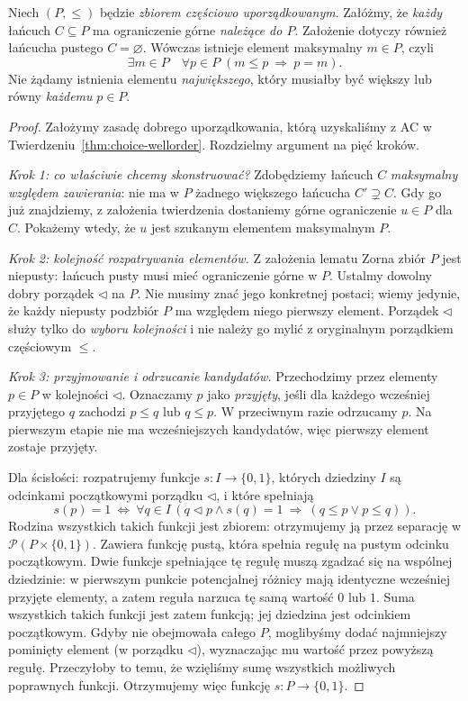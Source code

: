 \begin{twierdzenie}\label{thm:choice-zorn}
Niech $(P,\le)$ będzie \emph{zbiorem częściowo uporządkowanym}.
Załóżmy, że \emph{każdy} łańcuch $C\subseteq P$
ma ograniczenie górne \emph{należące do $P$}.
Założenie dotyczy również łańcucha pustego $C=\varnothing$.
Wówczas istnieje element maksymalny $m\in P$, czyli
\[
\exists m\in P\quad\forall p\in P\;(m\le p\ \Longrightarrow\ p=m).
\]
Nie żądamy istnienia elementu \emph{największego},
który musiałby być większy lub równy \emph{każdemu} $p\in P$.
\end{twierdzenie}
\begin{proof}
Założymy zasadę dobrego uporządkowania,
którą uzyskaliśmy z AC w Twierdzeniu~\ref{thm:choice-wellorder}.
Rozdzielmy argument na pięć kroków.

\emph{Krok 1: co właściwie chcemy skonstruować?}
Zdobędziemy łańcuch $C$ \emph{maksymalny względem zawierania}:
nie ma w $P$ żadnego większego łańcucha $C'\supsetneq C$.
Gdy go już znajdziemy, z założenia twierdzenia dostaniemy
górne ograniczenie $u\in P$ dla $C$.
Pokażemy wtedy, że $u$ jest szukanym elementem maksymalnym $P$.

\emph{Krok 2: kolejność rozpatrywania elementów.}
Z założenia lematu Zorna zbiór $P$ jest niepusty:
łańcuch pusty musi mieć ograniczenie górne w $P$.
Ustalmy dowolny dobry porządek $\triangleleft$ na $P$.
Nie musimy znać jego konkretnej postaci; wiemy jedynie,
że każdy niepusty podzbiór $P$ ma względem niego
pierwszy element. Porządek $\triangleleft$ służy tylko
do \emph{wyboru kolejności} i nie należy go mylić
z oryginalnym porządkiem częściowym $\le$.

\emph{Krok 3: przyjmowanie i odrzucanie kandydatów.}
Przechodzimy przez elementy $p\in P$ w kolejności
$\triangleleft$. Oznaczamy $p$ jako \emph{przyjęty},
jeśli dla każdego wcześniej przyjętego $q$
zachodzi $p\le q$ lub $q\le p$.
W przeciwnym razie odrzucamy $p$.
Na pierwszym etapie nie ma wcześniejszych kandydatów,
więc pierwszy element zostaje przyjęty.

Dla ścisłości: rozpatrujemy funkcje
$s:I\to\{0,1\}$, których dziedziny $I$ są odcinkami
początkowymi porządku $\triangleleft$, i które spełniają
\[
s(p)=1\ \Longleftrightarrow\
\forall q\in I\,(q\triangleleft p\land s(q)=1
\ \Longrightarrow\ (q\le p\lor p\le q)).
\]
Rodzina wszystkich takich funkcji jest zbiorem:
otrzymujemy ją przez separację
w $\mathcal P(P\times\{0,1\})$.
Zawiera funkcję pustą, która spełnia regułę
na pustym odcinku początkowym.
Dwie funkcje spełniające tę regułę muszą zgadzać się
na wspólnej dziedzinie: w pierwszym punkcie potencjalnej
różnicy mają identyczne wcześniej przyjęte elementy,
a zatem reguła narzuca tę samą wartość $0$ lub $1$.
Suma wszystkich takich funkcji jest zatem funkcją;
jej dziedzina jest odcinkiem początkowym.
Gdyby nie obejmowała całego $P$, moglibyśmy dodać
najmniejszy pominięty element (w porządku $\triangleleft$),
wyznaczając mu wartość przez powyższą regułę.
Przeczyłoby to temu, że wzięliśmy sumę wszystkich
możliwych poprawnych funkcji.
Otrzymujemy więc funkcję $s:P\to\{0,1\}$.


\end{proof}
